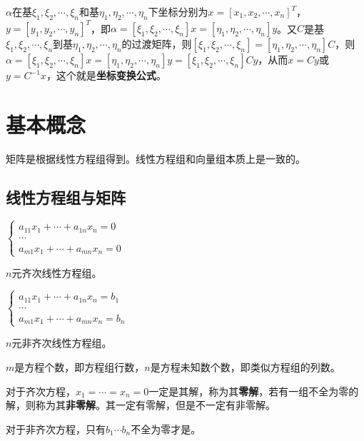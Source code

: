 \documentclass[UTF8, 12pt]{ctexart}
\begin{document}
$\alpha$在基$\xi_1,\xi_2,\cdots,\xi_n$和基$\eta_1,\eta_2,\cdots,\eta_n$下坐标分别为$x=[x_1,x_2,\cdots,x_n]^T$，$y=[y_1,y_2,\cdots,y_n]^T$，即$\alpha=[\xi_1,\xi_2,\cdots,\xi_n]x=[\eta_1,\eta_2,\cdots,\eta_n]y$。又$C$是基$\xi_1,\xi_2,\cdots,\xi_n$到基$\eta_1,\eta_2,\cdots,\eta_n$的过渡矩阵，则$[\xi_1,\xi_2,\cdots,\xi_n]=[\eta_1,\eta_2,\cdots,\eta_n]C$，则$\alpha=[\xi_1,\xi_2,\cdots,\xi_n]x=[\eta_1,\eta_2,\cdots,\eta_n]y=[\xi_1,\xi_2,\cdots,\xi_n]Cy$，从而$x=Cy$或$y=C^{-1}x$，这个就是\textbf{坐标变换公式}。

\section{基本概念}

矩阵是根据线性方程组得到。线性方程组和向量组本质上是一致的。

\subsection{线性方程组与矩阵}

\begin{multicols}{2}

$\begin{cases}
a_{11}x_1+\cdots+a_{1n}x_n=0 \\
\cdots \\
a_{m1}x_1+\cdots+a_{mn}x_n=0
\end{cases}$ \medskip

$n$元齐次线性方程组。

$\begin{cases}
a_{11}x_1+\cdots+a_{1n}x_n=b_1 \\
\cdots \\
a_{m1}x_1+\cdots+a_{mn}x_n=b_n
\end{cases}$ \medskip

$n$元非齐次线性方程组。

\end{multicols}

$m$是方程个数，即方程组行数，$n$是方程未知数个数，即类似方程组的列数。

对于齐次方程，$x_1=\cdots=x_n=0$一定是其解，称为其\textbf{零解}，若有一组不全为零的解，则称为其\textbf{非零解}。其一定有零解，但是不一定有非零解。

对于非齐次方程，只有$b_1\cdots b_n$不全为零才是。\medskip
\end{document}
